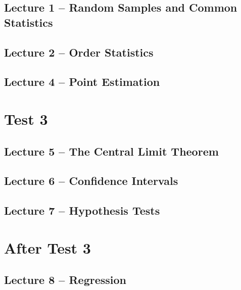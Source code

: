 \documentclass{article}
\begin{document}
\subsection{Lecture 1 -- Random Samples and Common Statistics}
\newpage

\subsection{Lecture 2 -- Order Statistics}
\newpage

\subsection{Lecture 4 -- Point Estimation}
\newpage


\section{Test 3}

\secttoc

\subsection{Lecture 5 -- The Central Limit Theorem}
\newpage

\subsection{Lecture 6 -- Confidence Intervals}
\newpage

\subsection{Lecture 7 -- Hypothesis Tests}
\newpage


\section{After Test 3}

\secttoc

\subsection{Lecture 8 -- Regression}
\newpage
\end{document}
